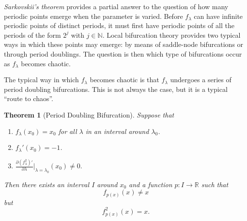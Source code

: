 \documentclass[10pt,twoside,titlepage]{book}
\numberwithin{equation}{chapter}
\numberwithin{figure}{chapter}
\numberwithin{table}{chapter}
\theoremstyle{plain}%
\newtheorem{thm}{Theorem}[chapter]
\theoremstyle{definition}
\theoremstyle{remark}
\begin{document}
\emph{Sarkovskii's theorem} provides a partial answer to the question of how many periodic points emerge when the parameter is varied. Before $f_{\lambda}$ can have infinite periodic points of distinct periods, it must first have periodic points of all the periods of the form $2^{j}$ with $j\in\mathbb{N}$. Local bifurcation theory provides two typical ways in which these points may emerge: by means of saddle-node bifurcations or through period doublings. The question is then which type of bifurcations occur as $f_{\lambda}$ becomes chaotic.

The typical way in which $f_{\lambda}$ becomes chaotic is that $f_{\lambda}$ undergoes a series of  period doubling bifurcations. This is not always the case, but it is a typical ``route to chaos''.

\begin{thm}[Period Doubling Bifurcation]
	\label{thm:perioddoubling}
	Suppose that
	\begin{enumerate}
		\item $f_{\lambda}(x_{0})=x_{0}$ for all $\lambda$ in an interval around $\lambda_{0}$.
		\item $f_{\lambda}'(x_{0})=-1$.
		\item $\frac{\partial(f_{\lambda}^{2})'}{\partial\lambda}\vert_{\lambda=\lambda_{0}}(x_0)\neq0.$
	\end{enumerate}
	Then there exists an interval $I$ around $x_{0}$ and a function $p:I\rightarrow\mathbb{R}$ such that
	\[f_{p(x)}(x)\neq x\]
	but
	\[f_{p(x)}^{2}(x)=x.\]
\end{thm}
\end{document}
